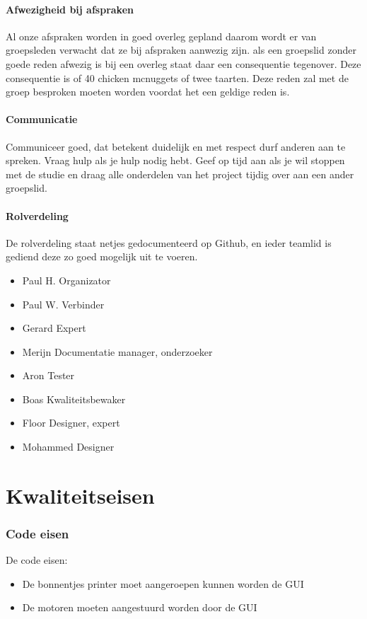 \documentclass{article}
\begin{document}
\paragraph{Afwezigheid bij afspraken}

Al onze afspraken worden in goed overleg gepland daarom wordt er van groepsleden verwacht
dat ze bij afspraken aanwezig zijn. als een groepslid zonder goede reden afwezig is bij een
overleg staat daar een consequentie tegenover. Deze consequentie is of 40 chicken mcnuggets
of twee taarten. Deze reden zal met de groep besproken moeten worden voordat het een geldige reden is.

\paragraph{Communicatie}

Communiceer goed, dat betekent duidelijk en met respect durf anderen aan te spreken.
Vraag hulp als je hulp nodig hebt.
Geef op tijd aan als je wil stoppen met de studie en draag alle onderdelen van het project tijdig
over aan een ander groepslid.

\paragraph{Rolverdeling}

De rolverdeling staat netjes gedocumenteerd op Github, en ieder teamlid is gediend deze zo
goed mogelijk uit te voeren.
\begin{itemize}
\item Paul H. Organizator
\item Paul W. Verbinder
\item Gerard Expert
\item Merijn Documentatie manager, onderzoeker
\item Aron Tester
\item Boas Kwaliteitsbewaker
\item Floor Designer, expert
\item Mohammed Designer
\end{itemize}

\newpage

\section{Kwaliteitseisen}


\subsubsection{Code eisen}
De code eisen:
\begin{itemize}
	\item De bonnentjes printer moet aangeroepen kunnen worden de GUI
	\item De motoren moeten aangestuurd worden door de GUI 
\end{itemize}
\end{document}
